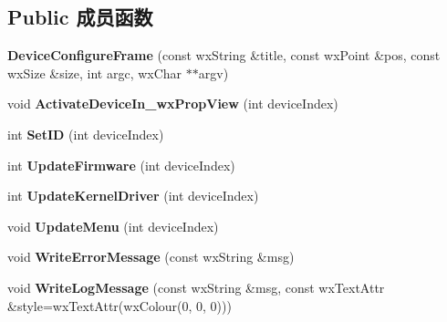 \subsection*{Public 成员函数}
\begin{DoxyCompactItemize}
\item 
\hypertarget{class_device_configure_frame_a5aa7b89452ac0120c1b07106373fe2c9}{{\bfseries Device\+Configure\+Frame} (const wx\+String \&title, const wx\+Point \&pos, const wx\+Size \&size, int argc, wx\+Char $\ast$$\ast$argv)}\label{class_device_configure_frame_a5aa7b89452ac0120c1b07106373fe2c9}

\item 
\hypertarget{class_device_configure_frame_ac16c993b711c6fc102a4ec5fb9dcf244}{void {\bfseries Activate\+Device\+In\+\_\+wx\+Prop\+View} (int device\+Index)}\label{class_device_configure_frame_ac16c993b711c6fc102a4ec5fb9dcf244}

\item 
\hypertarget{class_device_configure_frame_a806a866d8f3221b7f988cd725f0b3935}{int {\bfseries Set\+I\+D} (int device\+Index)}\label{class_device_configure_frame_a806a866d8f3221b7f988cd725f0b3935}

\item 
\hypertarget{class_device_configure_frame_aaa66e73fe4982bc2395f62e015737418}{int {\bfseries Update\+Firmware} (int device\+Index)}\label{class_device_configure_frame_aaa66e73fe4982bc2395f62e015737418}

\item 
\hypertarget{class_device_configure_frame_a307cef004ff3454b81af133aa6b03a57}{int {\bfseries Update\+Kernel\+Driver} (int device\+Index)}\label{class_device_configure_frame_a307cef004ff3454b81af133aa6b03a57}

\item 
\hypertarget{class_device_configure_frame_a8293f3486ee95da3c2c531084c1ae155}{void {\bfseries Update\+Menu} (int device\+Index)}\label{class_device_configure_frame_a8293f3486ee95da3c2c531084c1ae155}

\item 
\hypertarget{class_device_configure_frame_ac75daa5701ca7dd1cbf545afcbaa0b2d}{void {\bfseries Write\+Error\+Message} (const wx\+String \&msg)}\label{class_device_configure_frame_ac75daa5701ca7dd1cbf545afcbaa0b2d}

\item 
\hypertarget{class_device_configure_frame_aaadb7d4cbf3c9223fa3052e1525cfcde}{void {\bfseries Write\+Log\+Message} (const wx\+String \&msg, const wx\+Text\+Attr \&style=wx\+Text\+Attr(wx\+Colour(0, 0, 0)))}\label{class_device_configure_frame_aaadb7d4cbf3c9223fa3052e1525cfcde}


\end{DoxyCompactItemize}

